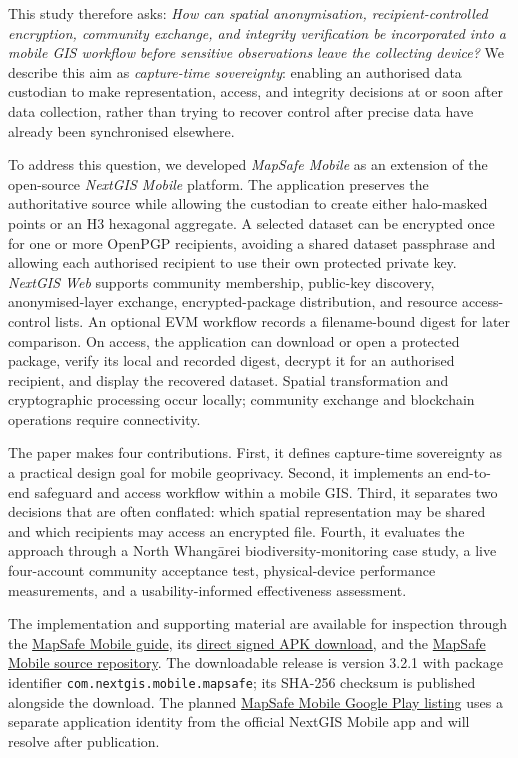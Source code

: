 \documentclass[]{interact}
\begin{document}
This study therefore asks: \emph{How can spatial anonymisation, recipient-controlled encryption, community exchange, and integrity verification be incorporated into a mobile GIS workflow before sensitive observations leave the collecting device?} We describe this aim as \emph{capture-time sovereignty}: enabling an authorised data custodian to make representation, access, and integrity decisions at or soon after data collection, rather than trying to recover control after precise data have already been synchronised elsewhere.

To address this question, we developed \textit{MapSafe Mobile} as an extension of the open-source \textit{NextGIS Mobile} platform. The application preserves the authoritative source while allowing the custodian to create either halo-masked points or an H3 hexagonal aggregate. A selected dataset can be encrypted once for one or more OpenPGP recipients, avoiding a shared dataset passphrase and allowing each authorised recipient to use their own protected private key. \textit{NextGIS Web} supports community membership, public-key discovery, anonymised-layer exchange, encrypted-package distribution, and resource access-control lists. An optional EVM workflow records a filename-bound digest for later comparison. On access, the application can download or open a protected package, verify its local and recorded digest, decrypt it for an authorised recipient, and display the recovered dataset. Spatial transformation and cryptographic processing occur locally; community exchange and blockchain operations require connectivity.

The paper makes four contributions. First, it defines capture-time sovereignty as a practical design goal for mobile geoprivacy. Second, it implements an end-to-end safeguard and access workflow within a mobile GIS. Third, it separates two decisions that are often conflated: which spatial representation may be shared and which recipients may access an encrypted file. Fourth, it evaluates the approach through a North Whang\={a}rei biodiversity-monitoring case study, a live four-account community acceptance test, physical-device performance measurements, and a usability-informed effectiveness assessment.

The implementation and supporting material are available for inspection through the \href{https://sharmapn.github.io/mapsafemobile/}{MapSafe Mobile guide}, its \href{https://sharmapn.github.io/mapsafemobile/downloads/MapSafeMobile-3.2.1.apk}{direct signed APK download}, and the \href{https://github.com/sharmapn/nextgis_mobile_mapsafe_geoprivacy}{MapSafe Mobile source repository}. The downloadable release is version 3.2.1 with package identifier \texttt{com.nextgis.mobile.mapsafe}; its SHA-256 checksum is published alongside the download. The planned \href{https://play.google.com/store/apps/details?id=com.nextgis.mobile.mapsafe}{MapSafe Mobile Google Play listing} uses a separate application identity from the official NextGIS Mobile app and will resolve after publication.
\end{document}
